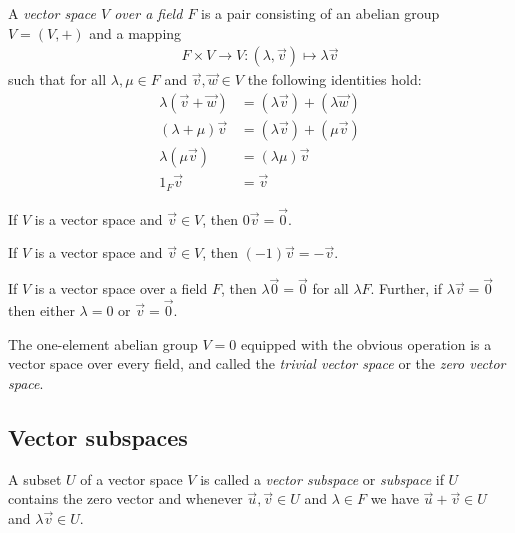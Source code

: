 \documentclass{article}
\begin{document}
\begin{definition}
	A \emph{vector space $V$ over a field $F$} is a pair consisting of an abelian
	group $V=(V,+)$ and a mapping
	\begin{align*}
		F\times V\to V:(\lambda,\vec v) \mapsto \lambda \vec v
	\end{align*}
	such that for all $\lambda,\mu\in F$ and $\vec v,\vec w\in V$ the following
	identities hold:
	\begin{align*}
		\lambda(\vec v + \vec w) & = (\lambda\vec v) + (\lambda \vec w) \\
		(\lambda +\mu)\vec v     & = (\lambda\vec v) + (\mu \vec v)     \\
		\lambda(\mu\vec v)       & = (\lambda\mu)\vec v                 \\
		1_F \vec v               & = \vec v
	\end{align*}
\end{definition}

\begin{lemma}[Notes 1.2.2]
	If $V$ is a vector space and $\vec v\in V$, then $0\vec v =\vec 0$.
\end{lemma}

\begin{lemma}[Notes 1.2.3]
	If $V$ is a vector space and $\vec v\in V$, then $(-1)\vec v = -\vec v$.
\end{lemma}

\begin{lemma}[Notes 1.2.4]
	If $V$ is a vector space over a field $F$, then $\lambda\vec 0=\vec 0$
	for all $\lambda F$. Further, if $\lambda\vec v=\vec 0$ then either
	$\lambda =0$ or $\vec v =\vec 0$.
\end{lemma}

\begin{definition}
	The one-element abelian group $V=0$ equipped with the
	obvious operation is a vector space over every field, and called the
	\emph{trivial vector space} or the \emph{zero vector space}.
\end{definition}

\subsection{Vector subspaces}

\begin{definition}
	A subset $U$ of a vector space $V$ is called a \emph{vector subspace} or
	\emph{subspace} if $U$ contains the zero vector and whenever $\vec u,\vec v\in U$
	and $\lambda\in F$ we have $\vec u + \vec v\in U$ and $\lambda\vec v\in U$.
\end{definition}
\end{document}
